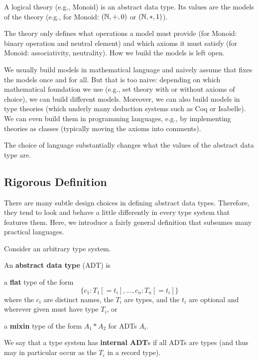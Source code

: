 \begin{example}[Theories]
A logical theory (e.g., Monoid) is an abstract data type.
Its values are the models of the theory (e.g., for Monoid: $(\mathbb{N},+,0)$ or $(\mathbb{N},*,1)$).

The theory only defines what operations a model must provide (for Monoid: binary operation and neutral element) and which axioms it must satisfy (for Monoid: associativity, neutrality).
How we build the models is left open.

We usually build models in mathematical language and naively assume that fixes the models once and for all.
But that is too naive: depending on which mathematical foundation we use (e.g., set theory with or without axioms of choice), we can build different models.
Moreover, we can also build models in type theories (which underly many deduction systems such as Coq or Isabelle).
We can even build them in programming languages, e.g., by implementing theories as classes (typically moving the axioms into comments).

The choice of language substantially changes what the values of the abstract data type are.
\end{example}

\subsection{Rigorous Definition}

There are many subtle design choices in defining abstract data types.
Therefore, they tend to look and behave a little differently in every type system that features them.
Here, we introduce a fairly general definition that subsumes many practical languages.

\begin{definition}
Consider an arbitrary type system.

An \textbf{abstract data type} (ADT) is
\begin{compactitem}
\item a \textbf{flat} type of the form
  \[\{c_1:T_1[=t_i],\ldots,c_n:T_n[=t_i]\}\]
  where the $c_i$ are distinct names, the $T_i$ are types, and the $t_i$ are optional and wherever given must have type $T_i$, or
\item a \textbf{mixin} type of the form $A_1*A_2$ for ADTs $A_i$.
\end{compactitem}

We say that a type system has \textbf{internal ADT}s if all ADTs are types (and thus may in particular occur as the $T_i$ in a record type).
\end{definition}

